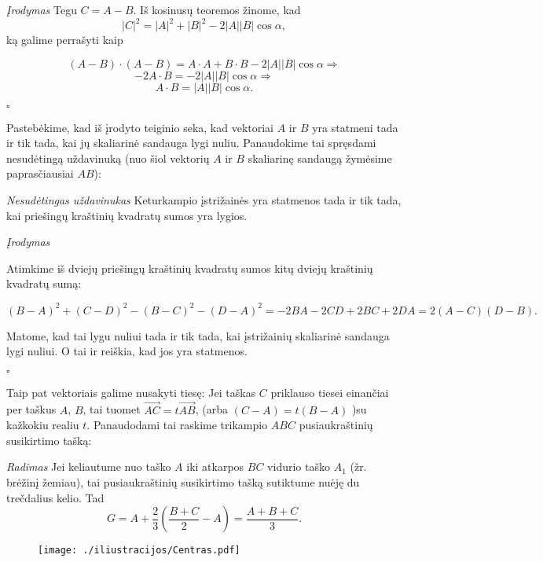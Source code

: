 {\it Įrodymas} Tegu $C=A-B$. Iš kosinusų teoremos žinome, kad $$|C|^2 = |A|^2 + |B|^2 - 2|A||B|\cos{\alpha},$$ ką galime perrašyti kaip 

$$(A-B)\cdot(A-B)=A\cdot A + B\cdot B - 2|A||B|\cos{\alpha} \Rightarrow$$
$$-2A\cdot B = -2|A||B|\cos{\alpha} \Rightarrow$$
$$A\cdot B = |A||B|\cos{\alpha}.$$
\begin{flushright}
$\square$
\end{flushright}

Pastebėkime, kad iš įrodyto teiginio seka, kad vektoriai $A$ ir $B$ yra statmeni tada ir tik tada, kai jų skaliarinė sandauga lygi nuliu. Panaudokime tai spręsdami nesudėtingą uždavinuką (nuo šiol vektorių $A$ ir $B$ skaliarinę sandaugą žymėsime paprasčiausiai $AB$):


{\it Nesudėtingas uždavinukas} Keturkampio įstrižainės yra statmenos tada ir tik tada, kai priešingų kraštinių kvadratų sumos yra lygios.

\smallskip

{\it Įrodymas}

Atimkime iš dviejų priešingų kraštinių kvadratų sumos kitų dviejų kraštinių kvadratų sumą:

$$(B-A)^2 + (C-D)^2 - (B-C)^2 - (D-A)^2 = -2BA - 2CD + 2BC + 2DA = 2(A-C)(D-B).$$

Matome, kad tai lygu nuliui tada ir tik tada, kai įstrižainių skaliarinė sandauga lygi nuliui. O tai ir reiškia, kad jos yra statmenos. 
\begin{flushright}
$\square$
\end{flushright}

Taip pat vektoriais galime nusakyti tiesę: Jei taškas $C$ priklauso tiesei einančiai per taškus $A$, $B$, tai tuomet $\vec{AC} =t\vec{AB}$, (arba $(C-A)=t(B-A)$ )su kažkokiu realiu $t$. Panaudodami tai raskime trikampio $ABC$ pusiaukraštinių susikirtimo tašką:

{\it Radimas} Jei keliautume nuo taško $A$ iki atkarpos $BC$ vidurio taško $A_1$ (žr. brėžinį žemiau), tai pusiaukraštinių susikirtimo tašką sutiktume nuėję du trečdalius kelio. Tad $$G = A + \frac{2}{3}\left(\frac{B+C}{2} - A\right) = \frac{A+B+C}{3}.$$

\newpage 

\begin{figure}[h!]
  \begin{center}
    \texttt{[image: ./iliustracijos/Centras.pdf]}
  \end{center}
\end{figure}

